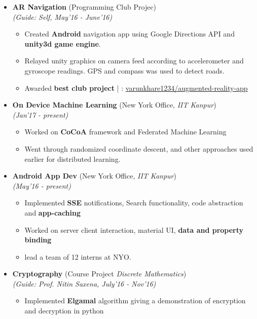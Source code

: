 \documentclass[a4paper,10pt]{article}
\newcommand{\isep}{-2 pt}
\begin{document}
\begin{itemize}
\item \textbf{AR Navigation} (Programming Club Projec) \\
 \emph{(Guide: Self, May'16 - June'16)} \\[-0.6cm]
	\begin{itemize}\itemsep \isep
	\item Created \textbf{Android} navigation app using Google Directions API and \textbf{unity3d game engine}.
	\item Relayed unity graphics on camera feed according to accelerometer and gyroscope readings. GPS and compass was used to detect roads.
	\item Awarded \textbf{best club project} | \faGithub : \href{https://github.com/varunkhare1234/augmented-reality-app}{varunkhare1234/augmented-reality-app}
	\end{itemize}
\item \textbf{On Device Machine Learning} (New York Office, \textit{IIT Kanpur}) \\
 \emph{(Jan'17 - present)} \\[-0.6cm]
	\begin{itemize}\itemsep \isep
	\item Worked on \textbf{CoCoA} framework and Federated Machine Learning 
	\item Went through randomized coordinate descent, and other approaches used earlier for distributed learning.
	\end{itemize}
\item \textbf{Android App Dev} (New York Office, \textit{IIT Kanpur}) \\
 \emph{(May'16 - present)} \\[-0.6cm]
	\begin{itemize}\itemsep \isep
	\item Implemented \textbf{SSE} notifications, Search functionality, code abstraction and \textbf{app-caching}
	\item Worked on server client interaction, material UI, \textbf{data and property binding} 
	\item lead a team of 12 interns at NYO.
	\end{itemize}
\item \textbf{Cryptography} (Course Project \textit{Discrete Mathematics}) \\
 \emph{(Guide: Prof. Nitin Saxena, July'16 - Nov'16)} \\[-0.6cm]
	\begin{itemize}\itemsep \isep
	\item Implemented \textbf{Elgamal} algorithm giving a demonstration of encryption and decryption in python

\end{itemize}
\end{itemize}
\end{document}
